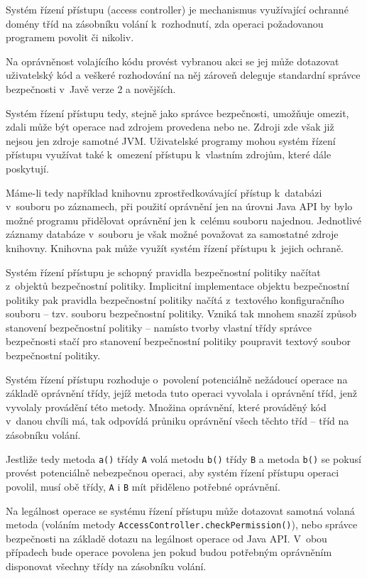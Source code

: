 Systém řízení přístupu (access controller) je mechanismus využívající ochranné domény tříd na zásobníku volání k~rozhodnutí, zda operaci požadovanou programem povolit či nikoliv.

Na oprávněnost volajícího kódu provést vybranou akci se jej může dotazovat uživatelský kód a veškeré rozhodování na něj zároveň deleguje standardní správce bezpečnosti v~Javě verze 2 a novějších. \cite{oaks}

Systém řízení přístupu tedy, stejně jako správce bezpečnosti, umožňuje omezit, zdali může být operace nad zdrojem provedena nebo ne. Zdroji zde však již nejsou jen zdroje samotné JVM. Uživatelské programy mohou systém řízení přístupu využívat také k~omezení přístupu k~vlastním zdrojům, které dále poskytují. \cite{oaks}

Máme-li tedy například knihovnu zprostředkovávající přístup k~databázi v~souboru po záznamech, při použití oprávnění jen na úrovni Java API by bylo možné programu přidělovat oprávnění jen k~celému souboru najednou. Jednotlivé záznamy databáze v~souboru je však možné považovat za samostatné zdroje knihovny. Knihovna pak může využít systém řízení přístupu k~jejich ochraně.

Systém řízení přístupu je schopný pravidla bezpečnostní politiky načítat z~objektů bezpečnostní politiky.
Implicitní implementace objektu bezpečnostní politiky pak pravidla bezpečnostní politiky načítá z~textového konfiguračního souboru -- tzv. souboru bezpečnostní politiky.
Vzniká tak mnohem snazší způsob stanovení bezpečnostní politiky -- namísto tvorby vlastní třídy správce bezpečnosti stačí pro stanovení bezpečnostní politiky poupravit textový soubor bezpečnostní politiky. \cite{oaks}

Systém řízení přístupu rozhoduje o~povolení potenciálně nežádoucí operace na základě oprávnění třídy, jejíž metoda tuto operaci vyvolala i oprávnění tříd,
jenž vyvolaly provádění této metody.
Množina oprávnění, které prováděný kód v~danou chvíli má, tak odpovídá průniku oprávnění všech těchto tříd -- tříd na zásobníku volání.

Jestliže tedy metoda {\tt a()} třídy {\tt A} volá metodu {\tt b()} třídy {\tt B} a metoda {\tt b()} se pokusí provést potenciálně nebezpečnou operaci,
aby systém řízení přístupu operaci povolil, musí obě třídy, {\tt A} i {\tt B} mít přiděleno potřebné oprávnění.

Na legálnost operace se systému řízení přístupu může dotazovat samotná volaná metoda (voláním metody {\tt AccessController.checkPermission()}), nebo správce bezpečnosti na základě dotazu na legálnost operace od Java API. V~obou případech bude operace povolena jen pokud budou potřebným oprávněním disponovat všechny třídy na zásobníku volání.


